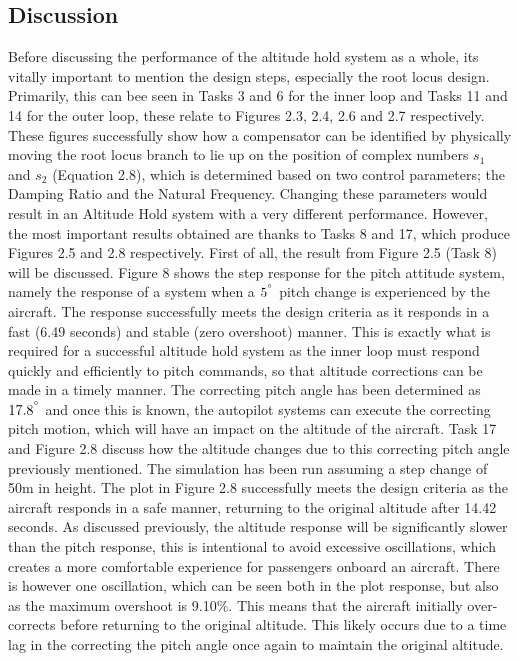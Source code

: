 \documentclass[stu, a4paper, 12pt, floatsintext]{apa7}
\numberwithin{figure}{section}
\numberwithin{table}{section}
\numberwithin{equation}{section}
\begin{document}
\subsection{Discussion}
Before discussing the performance of the altitude hold system as a whole, its vitally important to mention the design steps, especially the root locus design. Primarily, this can bee seen in Tasks 3 and 6 for the inner loop and Tasks 11 and 14 for the outer loop, these relate to Figures 2.3, 2.4, 2.6 and 2.7 respectively. 
These figures successfully show how a compensator can be identified by physically moving the root locus branch to lie up on the position of complex numbers $s_1$ and $s_2$ (Equation 2.8), which is determined based on two control parameters; the Damping Ratio and the Natural Frequency. Changing these parameters would result in an Altitude Hold system with a very different performance. 
However, the most important results obtained are thanks to Tasks 8 and 17, which produce Figures 2.5 and 2.8 respectively. 
First of all, the result from Figure 2.5 (Task 8) will be discussed. Figure 8 shows the step response for the pitch attitude system, namely the response of a system when a $5^{\degree}$ pitch change is experienced by the aircraft. The response successfully meets the design criteria as it responds in a fast (6.49 seconds) and stable (zero overshoot) manner. This is exactly what is required for a successful altitude hold system as the inner loop must respond quickly and efficiently to pitch commands, so that altitude corrections can be made in a timely manner. The correcting pitch angle has been determined as $17.8^{\degree}$ and once this is known, the autopilot systems can execute the correcting pitch motion, which will have an impact on the altitude of the aircraft. 
Task 17 and Figure 2.8 discuss how the altitude changes due to this correcting pitch angle previously mentioned. The simulation has been run assuming a step change of 50m in height. The plot in Figure 2.8 successfully meets the design criteria as the aircraft responds in a safe manner, returning to the original altitude after 14.42 seconds. As discussed previously, the altitude response will be significantly slower than the pitch response, this is intentional to avoid excessive oscillations, which creates a more comfortable experience for passengers onboard an aircraft. There is however one oscillation, which can be seen both in the plot response, but also as the maximum overshoot is 9.10\%. This means that the aircraft initially over-corrects before returning to the original altitude. This likely occurs due to a time lag in the correcting the pitch angle once again to maintain the original altitude.     
\end{document}
